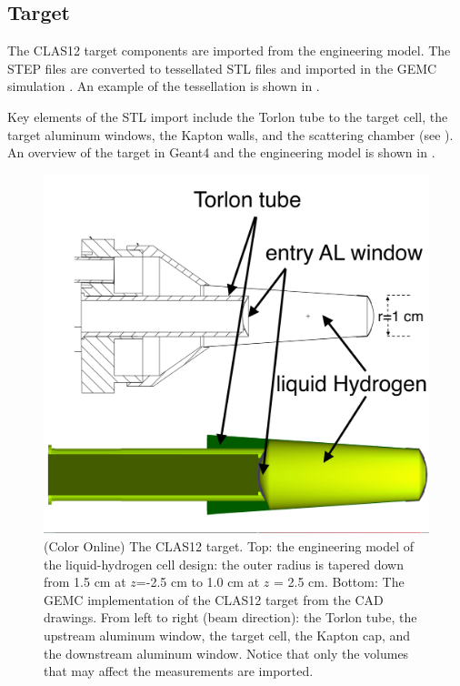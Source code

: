 \subsection{Target}

The CLAS12 target components are imported from the engineering model. The STEP files are converted to tessellated STL files and imported
in the GEMC simulation \cite{targetCorrection, targetStudy}. An example of the tessellation is shown in .

Key elements of the STL import include the Torlon tube to the target cell,
the target aluminum windows, the Kapton walls, and the scattering chamber (see ).
An overview of the target in Geant4 and the engineering model is shown in .

\begin{figure}
	\centering
	\includegraphics[width=0.99\columnwidth,keepaspectratio]{img/targetDesign.png}
	\caption{(Color Online) The CLAS12 target. Top: the engineering model of the liquid-hydrogen cell design: the outer radius is
             tapered down from 1.5 cm at $z$=-2.5 cm to 1.0 cm at $z$ = 2.5 cm.
             Bottom: The GEMC implementation of the CLAS12 target from the CAD drawings. From left to right (beam direction):
             the Torlon tube, the upstream aluminum window, the target cell, the Kapton cap, and the
			 downstream aluminum window. Notice that only the volumes that may affect the measurements are imported.}
	\label{fig:targetDesign}
\end{figure}


